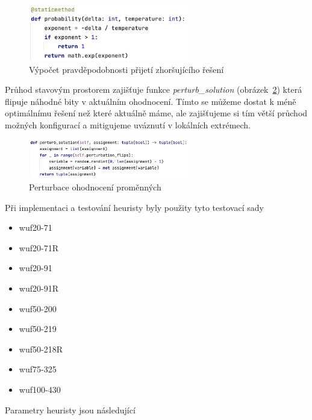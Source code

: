 \documentclass[twoside,twocolumn]{article}
\begin{document}
    \begin{figure}
        \centering
        \includegraphics[width=7cm]{images/probabilty}
        \caption{Výpočet pravděpodobnosti přijetí zhoršujícího řešení}
        \label{fig:probabilty}
    \end{figure}

    Průhod stavovým prostorem zajišťuje funkce \emph{perturb\_solution} (obrázek~\ref{fig:perturb}) která flipuje náhodné bity v aktuálním ohodnocení.
    Tímto se můžeme dostat k méně optimálnímu řešení než které aktuálně máme, ale zajišťujeme si tím větší průchod
    možných konfigurací a mitigujeme uváznutí v lokálních extrémech.

    \begin{figure}
        \centering
        \includegraphics[width=7cm]{images/perturb}
        \caption{Perturbace ohodnocení proměnných}
        \label{fig:perturb}
    \end{figure}

    Při implementaci a testování heuristy byly použity tyto testovací sady

    \begin{itemize}
        \item wuf20-71
        \item wuf20-71R
        \item wuf20-91
        \item wuf20-91R
        \item wuf50-200
        \item wuf50-219
        \item wuf50-218R
        \item wuf75-325
        \item wuf100-430
    \end{itemize}

    Parametry heuristy jsou následující
\end{document}
